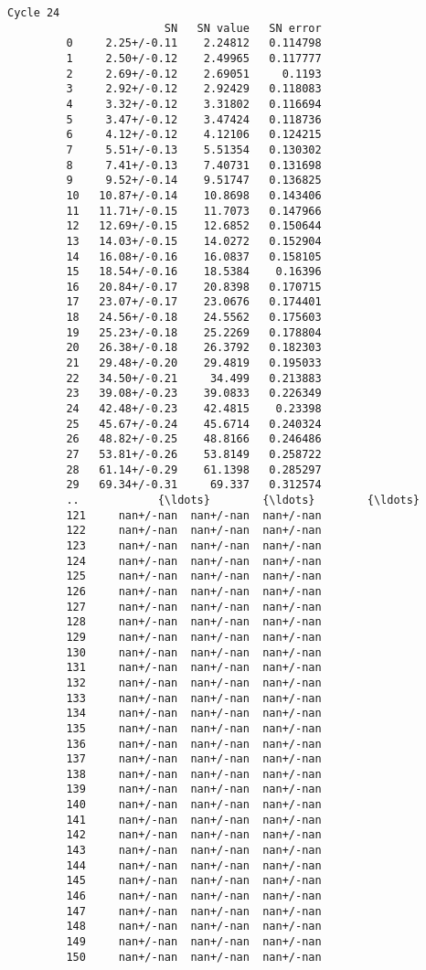 \documentclass[11pt]{article}
\begin{document}
\begin{Verbatim}[commandchars=\\\{\}]
                  Cycle 24                        
                        SN   SN value   SN error  
         0     2.25+/-0.11    2.24812   0.114798  
         1     2.50+/-0.12    2.49965   0.117777  
         2     2.69+/-0.12    2.69051     0.1193  
         3     2.92+/-0.12    2.92429   0.118083  
         4     3.32+/-0.12    3.31802   0.116694  
         5     3.47+/-0.12    3.47424   0.118736  
         6     4.12+/-0.12    4.12106   0.124215  
         7     5.51+/-0.13    5.51354   0.130302  
         8     7.41+/-0.13    7.40731   0.131698  
         9     9.52+/-0.14    9.51747   0.136825  
         10   10.87+/-0.14    10.8698   0.143406  
         11   11.71+/-0.15    11.7073   0.147966  
         12   12.69+/-0.15    12.6852   0.150644  
         13   14.03+/-0.15    14.0272   0.152904  
         14   16.08+/-0.16    16.0837   0.158105  
         15   18.54+/-0.16    18.5384    0.16396  
         16   20.84+/-0.17    20.8398   0.170715  
         17   23.07+/-0.17    23.0676   0.174401  
         18   24.56+/-0.18    24.5562   0.175603  
         19   25.23+/-0.18    25.2269   0.178804  
         20   26.38+/-0.18    26.3792   0.182303  
         21   29.48+/-0.20    29.4819   0.195033  
         22   34.50+/-0.21     34.499   0.213883  
         23   39.08+/-0.23    39.0833   0.226349  
         24   42.48+/-0.23    42.4815    0.23398  
         25   45.67+/-0.24    45.6714   0.240324  
         26   48.82+/-0.25    48.8166   0.246486  
         27   53.81+/-0.26    53.8149   0.258722  
         28   61.14+/-0.29    61.1398   0.285297  
         29   69.34+/-0.31     69.337   0.312574  
         ..            {\ldots}        {\ldots}        {\ldots}  
         121     nan+/-nan  nan+/-nan  nan+/-nan  
         122     nan+/-nan  nan+/-nan  nan+/-nan  
         123     nan+/-nan  nan+/-nan  nan+/-nan  
         124     nan+/-nan  nan+/-nan  nan+/-nan  
         125     nan+/-nan  nan+/-nan  nan+/-nan  
         126     nan+/-nan  nan+/-nan  nan+/-nan  
         127     nan+/-nan  nan+/-nan  nan+/-nan  
         128     nan+/-nan  nan+/-nan  nan+/-nan  
         129     nan+/-nan  nan+/-nan  nan+/-nan  
         130     nan+/-nan  nan+/-nan  nan+/-nan  
         131     nan+/-nan  nan+/-nan  nan+/-nan  
         132     nan+/-nan  nan+/-nan  nan+/-nan  
         133     nan+/-nan  nan+/-nan  nan+/-nan  
         134     nan+/-nan  nan+/-nan  nan+/-nan  
         135     nan+/-nan  nan+/-nan  nan+/-nan  
         136     nan+/-nan  nan+/-nan  nan+/-nan  
         137     nan+/-nan  nan+/-nan  nan+/-nan  
         138     nan+/-nan  nan+/-nan  nan+/-nan  
         139     nan+/-nan  nan+/-nan  nan+/-nan  
         140     nan+/-nan  nan+/-nan  nan+/-nan  
         141     nan+/-nan  nan+/-nan  nan+/-nan  
         142     nan+/-nan  nan+/-nan  nan+/-nan  
         143     nan+/-nan  nan+/-nan  nan+/-nan  
         144     nan+/-nan  nan+/-nan  nan+/-nan  
         145     nan+/-nan  nan+/-nan  nan+/-nan  
         146     nan+/-nan  nan+/-nan  nan+/-nan  
         147     nan+/-nan  nan+/-nan  nan+/-nan  
         148     nan+/-nan  nan+/-nan  nan+/-nan  
         149     nan+/-nan  nan+/-nan  nan+/-nan  
         150     nan+/-nan  nan+/-nan  nan+/-nan  
         

\end{Verbatim}
\end{document}
